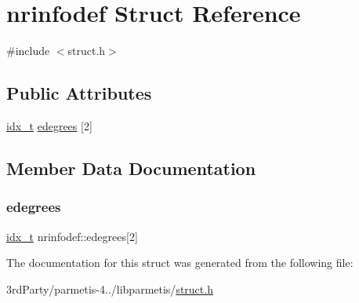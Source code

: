 \hypertarget{structnrinfodef}{}\section{nrinfodef Struct Reference}
\label{structnrinfodef}


{\ttfamily \#include $<$struct.\+h$>$}

\subsection*{Public Attributes}
\begin{DoxyCompactItemize}
\item 
\hyperlink{3rd_party_2parmetis-4_80_83_2metis_2include_2metis_8h_aaa5262be3e700770163401acb0150f52}{idx\+\_\+t} \hyperlink{structnrinfodef_ad0486695afd7e857406adc48fe520cdb}{edegrees} \mbox{[}2\mbox{]}
\end{DoxyCompactItemize}


\subsection{Member Data Documentation}
\mbox{\label{structnrinfodef_ad0486695afd7e857406adc48fe520cdb}} 
\subsubsection{\texorpdfstring{edegrees}{edegrees}}
{\footnotesize\ttfamily \hyperlink{3rd_party_2parmetis-4_80_83_2metis_2include_2metis_8h_aaa5262be3e700770163401acb0150f52}{idx\+\_\+t} nrinfodef\+::edegrees\mbox{[}2\mbox{]}}



The documentation for this struct was generated from the following file\+:\begin{DoxyCompactItemize}
\item 
3rd\+Party/parmetis-\/4../libparmetis/\hyperlink{libparmetis_2struct_8h}{struct.\+h}\end{DoxyCompactItemize}
